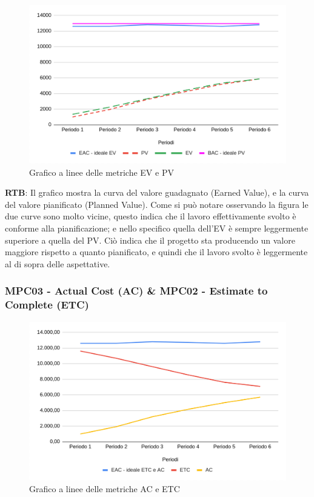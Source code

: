 \documentclass[10pt]{article}
\begin{document}
\begin{justify}
\begin{figure}[H]
  \centering
  \includegraphics[width=0.9\linewidth]{EV-PV.png}
  \caption{Grafico a linee delle metriche EV e PV}
  \label{fig:EV-PVchart}
\end{figure}

\textbf{RTB}: Il grafico mostra la curva del valore guadagnato (Earned Value), e la curva del valore pianificato (Planned Value). Come si può notare osservando la 
figura le due curve sono molto vicine, questo indica che il lavoro effettivamente svolto è conforme alla pianificazione; e nello specifico quella dell'EV è sempre 
leggermente superiore a quella del PV. Ciò indica che il progetto sta producendo un valore maggiore rispetto a quanto pianificato, e quindi che il lavoro svolto 
è leggermente al di sopra delle aspettative.


\subsubsection{MPC03 - Actual Cost (AC) \& MPC02 - Estimate to Complete (ETC)}

\begin{figure}[H]
  \centering
  \includegraphics[width=0.9\linewidth]{AC-ETC.png}
  \caption{Grafico a linee delle metriche AC e ETC}
  \label{fig:AC-ETCchart}
\end{figure}


\end{justify}
\end{document}
